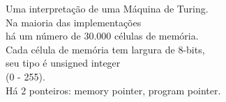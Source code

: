 \documentclass[preview]{standalone}
\begin{document}
Uma interpretação de uma Máquina de Turing.\\Na maioria das implementações\\há um número de 30.000 células de memória.\\Cada célula de memória tem largura de 8-bits,\\seu tipo é unsigned integer\\(0 - 255).\\Há 2 ponteiros: memory pointer, program pointer.\\
\end{document}
